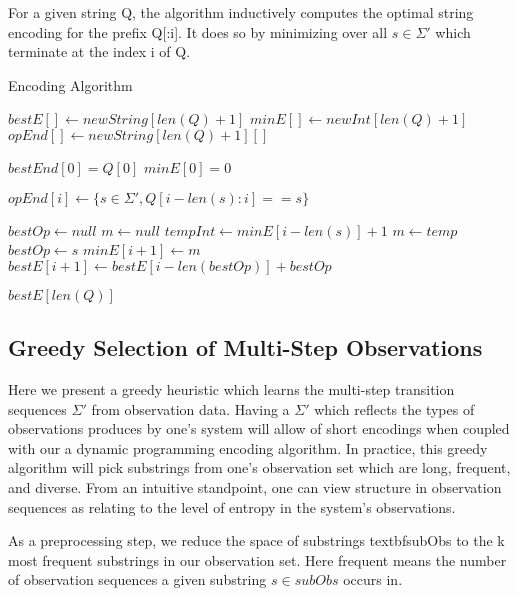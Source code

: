 For a given string Q, the algorithm inductively computes the optimal string encoding for the prefix Q[:i]. It does so by minimizing over all $s \in \Sigma'$ which terminate at the index i of Q.

\begin{algorithm}
\caption{Encoding Algorithm}
\label{Encoding Algorithm}
\begin{algorithmic}[1]

\State $bestE[] \gets new String[len(Q)+1]$
\State $minE[] \gets new Int[len(Q)+1]$
\State $opEnd[] \gets new String[len(Q)+1][]$

\State $bestEnd[0] = Q[0]$
\State $minE[0] = 0$

	 \State $opEnd[i] \gets \{s \in \Sigma', Q[i-len(s):i] == s\}$
\EndFor

	\State $bestOp \gets null$
	\State $m \gets null$ 
		\State $tempInt \gets minE[i-len(s)] + 1$
			\State $m \gets temp$ 
			\State $bestOp \gets s$
		\EndIf
	\EndFor
	\State $minE[i+1] \gets m$
	\State $bestE[i+1] \gets bestE[i-len(bestOp)] + bestOp$
\EndFor

\Return $bestE[len(Q)]$

\EndProcedure
\end{algorithmic}
\end{algorithm}

\subsection{Greedy Selection of Multi-Step Observations}

Here we present a greedy heuristic which learns the multi-step transition sequences $\Sigma'$ from observation data. Having a $\Sigma'$ which reflects the types of observations produces by one's system will allow of short encodings when coupled with our a dynamic programming encoding algorithm. In practice, this greedy algorithm will pick substrings from one's observation set which are long, frequent, and diverse. From an intuitive standpoint, one can view structure in observation sequences as relating to the level of entropy in the system's observations. 

As a preprocessing step, we reduce the space of substrings textbf{subObs} to the k most frequent substrings in our observation set. Here frequent means the number of observation sequences a given substring $s \in subObs$ occurs in. 

